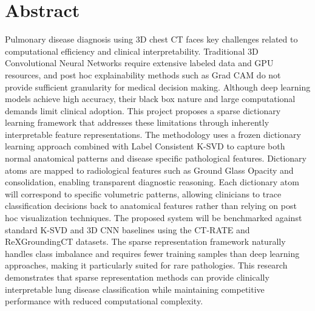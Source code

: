 \chapter*{Abstract}
Pulmonary disease diagnosis using 3D chest CT faces key challenges related to computational efficiency and clinical interpretability.
Traditional 3D Convolutional Neural Networks require extensive labeled data and GPU resources, and post hoc explainability methods
such as Grad CAM do not provide sufficient granularity for medical decision making.
Although deep learning models achieve high accuracy, their black box nature and large computational demands limit clinical
adoption. This project proposes a sparse dictionary learning framework that addresses these limitations through inherently
interpretable feature representations. The methodology uses a frozen dictionary learning approach combined with
Label Consistent K-SVD to capture both normal anatomical patterns and disease specific pathological features. Dictionary
atoms are mapped to radiological features such as Ground Glass Opacity and consolidation, enabling transparent
diagnostic reasoning. Each dictionary atom will correspond to specific volumetric patterns, allowing clinicians to trace classification
decisions back to anatomical features rather than relying on post hoc visualization techniques.
The proposed system will be benchmarked against standard K-SVD and 3D CNN baselines using the CT-RATE and ReXGroundingCT datasets.
The sparse representation framework naturally handles class imbalance and requires fewer training samples than deep learning
approaches, making it particularly suited for rare pathologies. This research demonstrates that sparse representation methods can
provide clinically interpretable lung disease classification while maintaining competitive performance with reduced computational complexity.
\newpage

\tableofcontents
\newpage

\listoffigures
\newpage

\listoftables
\newpage

\acuseall %
\printacronyms
\newpage